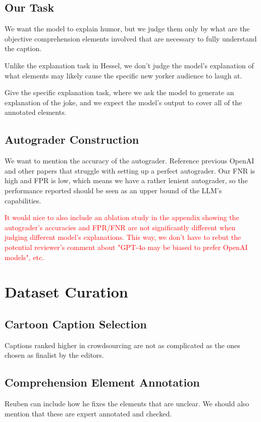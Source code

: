 \documentclass[11pt]{article}
\begin{document}
\subsection{Our Task}
We want the model to explain humor, but we judge them only by what are the objective comprehension elements involved that are necessary to fully understand the caption.

Unlike the explanation task in Hessel, we don't judge the model's explanation of what elements may likely cause the specific new yorker audience to laugh at.

Give the specific explanation task, where we ask the model to generate an explanation of the joke, and we expect the model's output to cover all of the annotated elements.

\subsection{Autograder Construction}
We want to mention the accuracy of the autograder. Reference previous OpenAI and other papers that struggle with setting up a perfect autograder. Our FNR is high and FPR is low, which means we have a rather lenient autograder, so the performance reported should be seen as an upper bound of the LLM's capabilities.

\textcolor{red}{It would nice to also include an ablation study in the appendix showing the autograder's accuracies and FPR/FNR are not significantly different when judging different model's explanations. This way, we don't have to rebut the potential reviewer's comment about "GPT-4o may be biased to prefer OpenAI models", etc.}

\section{Dataset Curation}
\subsection{Cartoon Caption Selection}
Captions ranked higher in crowdsourcing are not as complicated as the ones chosen as finalist by the editors.

\subsection{Comprehension Element Annotation}
Reuben can include how he fixes the elements that are unclear. We should also mention that these are expert annotated and checked.
\end{document}
